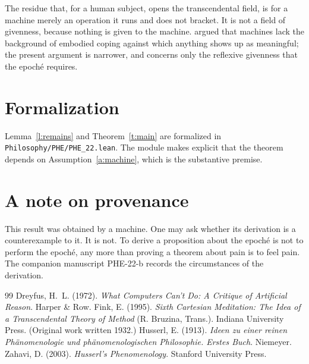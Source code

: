 \documentclass{situationist-preprint}
\begin{document}
The residue that, for a human subject, opens the transcendental field, is for a machine merely an operation it runs and does not bracket. It is not a field of givenness, because nothing is given to the machine. \citet{Dreyfus1972} argued that machines lack the background of embodied coping against which anything shows up as meaningful; the present argument is narrower, and concerns only the reflexive givenness that the epoché requires.

\section{Formalization}

Lemma~\ref{l:remains} and Theorem~\ref{t:main} are formalized in \nolinkurl{Philosophy/PHE/PHE_22.lean}. The module makes explicit that the theorem depends on Assumption~\ref{a:machine}, which is the substantive premise.

\section{A note on provenance}

This result was obtained by a machine. One may ask whether its derivation is a counterexample to it. It is not. To derive a proposition about the epoché is not to perform the epoché, any more than proving a theorem about pain is to feel pain. The companion manuscript PHE-22-b records the circumstances of the derivation.

\begin{thebibliography}{99}\small
{} Dreyfus, H.~L. (1972). \emph{What Computers Can't Do: A Critique of Artificial Reason}. Harper \& Row.
 Fink, E. (1995). \emph{Sixth Cartesian Meditation: The Idea of a Transcendental Theory of Method} (R. Bruzina, Trans.). Indiana University Press. (Original work written 1932.)
 Husserl, E. (1913). \emph{Ideen zu einer reinen Phänomenologie und phänomenologischen Philosophie. Erstes Buch}. Niemeyer.
 Zahavi, D. (2003). \emph{Husserl's Phenomenology}. Stanford University Press.
\end{thebibliography}
\end{document}
